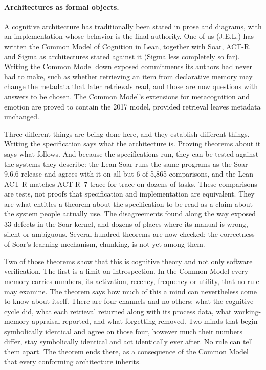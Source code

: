 \documentclass[11pt]{article}
\begin{document}
\paragraph{Architectures as formal objects.}
A cognitive architecture has traditionally been stated in prose and
diagrams, with an implementation whose behavior is the final authority.
One of us (J.E.L.) has written the Common Model of Cognition in Lean,
together with Soar, ACT-R and Sigma\cite{rosenbloom2016} as
architectures stated against it (Sigma less completely so far). Writing
the Common Model down exposed commitments its authors had never had to
make, such as whether retrieving an item from declarative memory may
change the metadata that later retrievals read, and those are now
questions with answers to be chosen. The Common Model's extensions for
metacognition and emotion are proved to contain the 2017 model,
provided retrieval leaves metadata unchanged.

Three different things are being done here, and they establish
different things. Writing the specification says what the architecture
is. Proving theorems about it says what follows. And because the
specifications run, they can be tested against the systems they
describe: the
Lean Soar runs the same programs as the Soar 9.6.6 release and agrees
with it on all but 6 of 5,865 comparisons, and the Lean ACT-R matches
ACT-R~7 trace for trace on dozens of tasks. These comparisons are
tests, not proofs that specification and implementation are equivalent.
They are what entitles a theorem about the specification to be read as
a claim about the system people actually use. The disagreements found
along the way exposed 33 defects in the Soar kernel, and dozens of
places where its manual is wrong, silent or ambiguous. Several hundred
theorems are now checked; the correctness of Soar's learning mechanism,
chunking, is not yet among them.

Two of those theorems show that this is cognitive theory and not only
software verification. The first is a limit on introspection. In the
Common Model every memory carries numbers, its activation, recency,
frequency or utility, that no rule may examine. The theorem says how
much of this a mind can nevertheless come to know about itself. There
are four channels and no others: what the cognitive cycle did, what
each retrieval returned along with its process data, what
working-memory appraisal reported, and what forgetting removed. Two
minds that begin symbolically identical and agree on those four,
however much their numbers differ, stay symbolically identical and act
identically ever after. No rule can tell them apart. The theorem ends
there, as a consequence of the Common Model that every conforming
architecture inherits.
\end{document}
